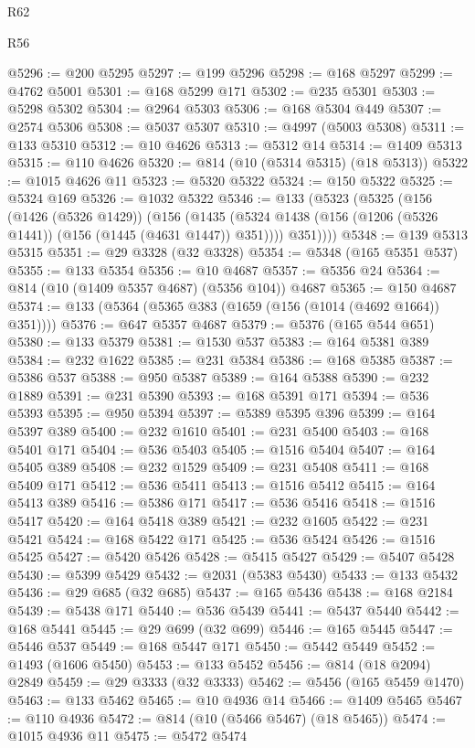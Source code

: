 \begin{lexlean}{R62}
\begin{lexlean}{R56}
\begin{coremodule}
{{{{{{{{{{{{{{{{{{{{{{{{{{{{{{{{{{{{{{{{{{{{{{{{{{{{{{{{{{{{{{{{{{{{{{{{{{{{{{{{{{{{{{{{{{{{{{{{{{{{{{{{{{{{{{{{{{{{{{{{{{{{{{{{{{{{{{{{{{{{{{{{{{{{{{{{{{{{{{{{{{{{{{{{{{{{{{{{{{{{{{{{{{{{{{{{{{{{{{{{{{{{{{{{{{{@5296 := @200 @5295
@5297 := @199 @5296
@5298 := @168 @5297
@5299 := @4762 @5001
@5301 := @168 @5299 @171
@5302 := @235 @5301
@5303 := @5298 @5302
@5304 := @2964 @5303
@5306 := @168 @5304 @449
@5307 := @2574 @5306
@5308 := @5037 @5307
@5310 := @4997 (@5003 @5308)
@5311 := @133 @5310
@5312 := @10 @4626
@5313 := @5312 @14
@5314 := @1409 @5313
@5315 := @110 @4626
@5320 := @814 (@10 (@5314 @5315) (@18 @5313))
@5322 := @1015 @4626 @11
@5323 := @5320 @5322
@5324 := @150 @5322
@5325 := @5324 @169
@5326 := @1032 @5322
@5346 := @133
    (@5323
      (@5325
        (@156
          (@1426 (@5326 @1429))
          (@156
            (@1435 (@5324 @1438 (@156 (@1206 (@5326 @1441)) (@156 (@1445 (@4631 @1447)) @351))))
            @351))))
@5348 := @139 @5313 @5315
@5351 := @29 @3328 (@32 @3328)
@5354 := @5348 (@165 @5351 @537)
@5355 := @133 @5354
@5356 := @10 @4687
@5357 := @5356 @24
@5364 := @814 (@10 (@1409 @5357 @4687) (@5356 @104)) @4687
@5365 := @150 @4687
@5374 := @133 (@5364 (@5365 @383 (@1659 (@156 (@1014 (@4692 @1664)) @351))))
@5376 := @647 @5357 @4687
@5379 := @5376 (@165 @544 @651)
@5380 := @133 @5379
@5381 := @1530 @537
@5383 := @164 @5381 @389
@5384 := @232 @1622
@5385 := @231 @5384
@5386 := @168 @5385
@5387 := @5386 @537
@5388 := @950 @5387
@5389 := @164 @5388
@5390 := @232 @1889
@5391 := @231 @5390
@5393 := @168 @5391 @171
@5394 := @536 @5393
@5395 := @950 @5394
@5397 := @5389 @5395 @396
@5399 := @164 @5397 @389
@5400 := @232 @1610
@5401 := @231 @5400
@5403 := @168 @5401 @171
@5404 := @536 @5403
@5405 := @1516 @5404
@5407 := @164 @5405 @389
@5408 := @232 @1529
@5409 := @231 @5408
@5411 := @168 @5409 @171
@5412 := @536 @5411
@5413 := @1516 @5412
@5415 := @164 @5413 @389
@5416 := @5386 @171
@5417 := @536 @5416
@5418 := @1516 @5417
@5420 := @164 @5418 @389
@5421 := @232 @1605
@5422 := @231 @5421
@5424 := @168 @5422 @171
@5425 := @536 @5424
@5426 := @1516 @5425
@5427 := @5420 @5426
@5428 := @5415 @5427
@5429 := @5407 @5428
@5430 := @5399 @5429
@5432 := @2031 (@5383 @5430)
@5433 := @133 @5432
@5436 := @29 @685 (@32 @685)
@5437 := @165 @5436
@5438 := @168 @2184
@5439 := @5438 @171
@5440 := @536 @5439
@5441 := @5437 @5440
@5442 := @168 @5441
@5445 := @29 @699 (@32 @699)
@5446 := @165 @5445
@5447 := @5446 @537
@5449 := @168 @5447 @171
@5450 := @5442 @5449
@5452 := @1493 (@1606 @5450)
@5453 := @133 @5452
@5456 := @814 (@18 @2094) @2849
@5459 := @29 @3333 (@32 @3333)
@5462 := @5456 (@165 @5459 @1470)
@5463 := @133 @5462
@5465 := @10 @4936 @14
@5466 := @1409 @5465
@5467 := @110 @4936
@5472 := @814 (@10 (@5466 @5467) (@18 @5465))
@5474 := @1015 @4936 @11
@5475 := @5472 @5474
}}}}}}}}}}}}}}}}}}}}}}}}}}}}}}}}}}}}}}}}}}}}}}}}}}}}}}}}}}}}}}}}}}}}}}}}}}}}}}}}}}}}}}}}}}}}}}}}}}}}}}}}}}}}}}}}}}}}}}}}}}}}}}}}}}}}}}}}}}}}}}}}}}}}}}}}}}}}}}}}}}}}}}}}}}}}}}}}}}}}}}}}}}}}}}}}}}}}}}}}}}}}}}}}}}}
\end{coremodule}
\end{lexlean}
\end{lexlean}
